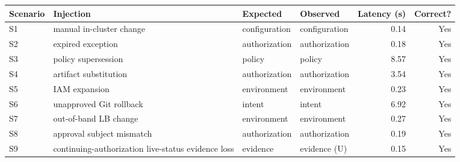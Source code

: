 \begin{tabular}{@{}llllrr@{}}
\toprule
Scenario & Injection & Expected & Observed & Latency (s) & Correct? \\
\midrule
S1 & manual in-cluster change & configuration & configuration & 0.14 & Yes \\
S2 & expired exception & authorization & authorization & 0.18 & Yes \\
S3 & policy supersession & policy & policy & 8.57 & Yes \\
S4 & artifact substitution & authorization & authorization & 3.54 & Yes \\
S5 & IAM expansion & environment & environment & 0.23 & Yes \\
S6 & unapproved Git rollback & intent & intent & 6.92 & Yes \\
S7 & out-of-band LB change & environment & environment & 0.27 & Yes \\
S8 & approval subject mismatch & authorization & authorization & 0.19 & Yes \\
S9 & continuing-authorization live-status evidence loss & evidence & evidence (U) & 0.15 & Yes \\
\bottomrule
\end{tabular}
